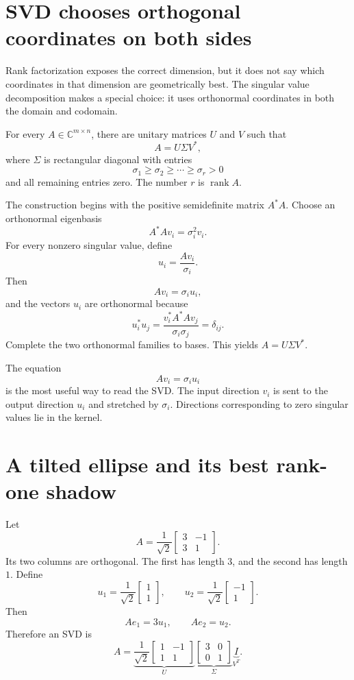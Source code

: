 \section{SVD chooses orthogonal coordinates on both sides}

Rank factorization exposes the correct dimension, but it does not say which coordinates in that dimension are geometrically best.  The singular value decomposition makes a special choice: it uses orthonormal coordinates in both the domain and codomain.

\begin{theorem}
For every \(A\in\mathbb C^{m\times n}\), there are unitary matrices \(U\) and \(V\) such that
\[
  A=U\Sigma V^*,
\]
where \(\Sigma\) is rectangular diagonal with entries
\[
  \sigma_1\ge\sigma_2\ge\cdots\ge\sigma_r>0
\]
and all remaining entries zero.  The number \(r\) is \(\operatorname{rank}A\).
\end{theorem}

The construction begins with the positive semidefinite matrix \(A^*A\).  Choose an orthonormal eigenbasis
\[
  A^*Av_i=\sigma_i^2v_i.
\]
For every nonzero singular value, define
\[
  u_i=\frac{Av_i}{\sigma_i}.
\]
Then
\[
  Av_i=\sigma_i u_i,
\]
and the vectors \(u_i\) are orthonormal because
\[
  u_i^*u_j
  =\frac{v_i^*A^*Av_j}{\sigma_i\sigma_j}
  =\delta_{ij}.
\]
Complete the two orthonormal families to bases.  This yields \(A=U\Sigma V^*\).

The equation
\[
  Av_i=\sigma_i u_i
\]
is the most useful way to read the SVD.  The input direction \(v_i\) is sent to the output direction \(u_i\) and stretched by \(\sigma_i\).  Directions corresponding to zero singular values lie in the kernel.

\section{A tilted ellipse and its best rank-one shadow}

Let
\[
  A=\frac1{\sqrt2}
  \begin{bmatrix}
    3&-1\\
    3&1
  \end{bmatrix}.
\]
Its two columns are orthogonal.  The first has length \(3\), and the second has length \(1\).  Define
\[
  u_1=\frac1{\sqrt2}
  \begin{bmatrix}1\\1\end{bmatrix},
  \qquad
  u_2=\frac1{\sqrt2}
  \begin{bmatrix}-1\\1\end{bmatrix}.
\]
Then
\[
  Ae_1=3u_1,
  \qquad
  Ae_2=u_2.
\]
Therefore an SVD is
\[
  A=
  \underbrace{\frac1{\sqrt2}
  \begin{bmatrix}
    1&-1\\
    1&1
  \end{bmatrix}}_{U}
  \underbrace{
  \begin{bmatrix}
    3&0\\
    0&1
  \end{bmatrix}}_{\Sigma}
  \underbrace{I}_{V^T}.
\]

